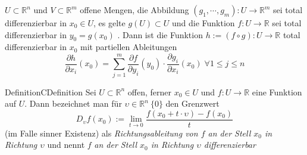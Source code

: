 $U\subset \mathbb{R} ^n$ und $V\subset \mathbb{R} ^m$ offene Mengen, die Abbildung
$ \left( g_1 , \cdots, g_{m} \right) : U \to \mathbb{R}^m  $ sei total differenzierbar in $ x_0 \in U $,
es gelte $ g(U) \subset U $ und die Funktion $ f: U \to \mathbb{R}  $ sei total differenzierbar in 
$ y_0 = g(x_0) $ . Dann ist die Funktion $ h:= (f \circ g): U \to \mathbb{R}  $ total differenzierbar in 
$ x_0 $ mit partiellen Ableitungen 
$$ \frac{\partial h}{\partial x_{i}} (x_0) = \sum_{j=1}^{m} \frac{\partial f }{\partial y_{i}} (y_0)
\cdot \frac{\partial g_{i}}{\partial x_{i}} (x_0)  \;  \forall 1 \leq j \leq n$$ 


\begin{ibox}[]{Definition}{CDefinition}
    Sei $ U \subset  \mathbb{R}^n  $ offen, ferner $ x_0 \in U $ und $ f: U \to \mathbb{R}  $ eine 
	Funktion auf $ U $. Dann bezeichnet man für $ \upsilon \in  \mathbb{R}^n \ \{0\} $ den Grenzwert 
	$$ D_{\upsilon}f(x_0) := \lim_{t \to 0} \frac{f(x_0 + t \cdot \upsilon)-f(x_0)}{t}  $$
	(im Falle sinner Existenz) als \textit{Richtungsableitung von $ f $ an der Stell $ x_0 $ in Richtung $ \upsilon $ } 
	und nennt $ f $ \textit{ an der Stell $ x_0 $ in Richtung $ \upsilon $ differenzierbar} 
\end{ibox}

